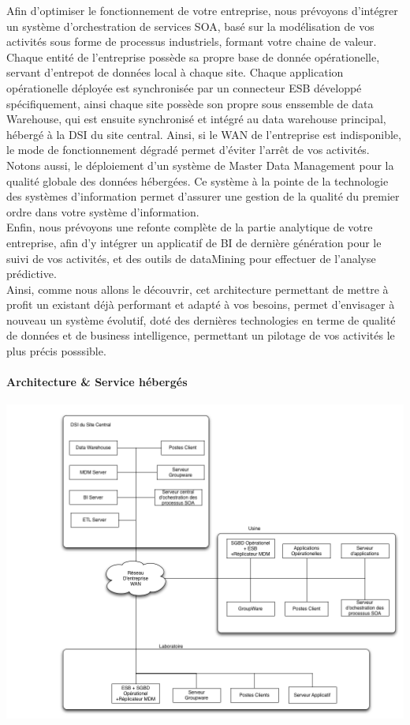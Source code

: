 Afin d'optimiser le fonctionnement de votre entreprise, nous prévoyons d'intégrer un système d'orchestration de services SOA, basé sur la modélisation de vos activités sous forme de processus industriels, formant votre chaine de valeur.\\
Chaque entité de l'entreprise possède sa propre base de donnée opérationelle, servant d'entrepot de données local à chaque site. Chaque application opérationelle déployée est synchronisée par un connecteur ESB développé spécifiquement, ainsi chaque site possède son propre sous enssemble de data Warehouse, qui est ensuite synchronisé et intégré au data warehouse principal, hébergé à la DSI du site central. Ainsi, si le WAN de l'entreprise est indisponible, le mode de fonctionnement dégradé permet d'éviter l'arrêt de vos activités.\\
Notons aussi, le déploiement d'un système de Master Data Management pour la qualité globale des données hébergées. Ce système à la pointe de la technologie des systèmes d'information permet d'assurer une gestion de la qualité du premier ordre dans votre système d'information.\\
Enfin, nous prévoyons une refonte complète de la partie analytique de votre entreprise, afin d'y intégrer un applicatif de BI de dernière génération pour le suivi de vos activités, et des outils de dataMining pour effectuer de l'analyse prédictive.\\

Ainsi, comme nous allons le découvrir, cet architecture permettant de mettre  à profit un existant déjà performant et adapté à vos besoins, permet d'envisager à nouveau un système évolutif, doté des dernières technologies en terme de qualité de données et de business intelligence, permettant un pilotage de vos activités le plus précis posssible.\\

\paragraph{Architecture & Service hébergés}

\includegraphics[scale=0.6]{DiagrameSOAPdc4.png}


